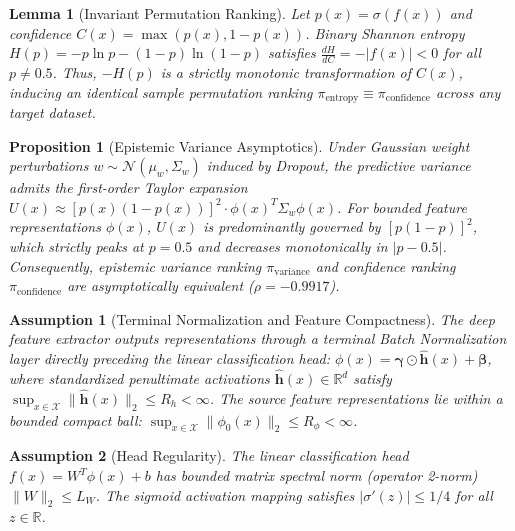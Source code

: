 \documentclass[journal]{IEEEtran}
\newtheorem{lemma}{Lemma}
\newtheorem{proposition}{Proposition}
\newtheorem{assumption}{Assumption}
\begin{document}
\begin{lemma}[Invariant Permutation Ranking]
\label{lem:ranking}
Let $p(x) = \sigma(f(x))$ and confidence $C(x) = \max(p(x), 1 - p(x))$. Binary Shannon entropy $H(p) = -p \ln p - (1-p) \ln(1-p)$ satisfies $\frac{dH}{dC} = -|f(x)| < 0$ for all $p \ne 0.5$. Thus, $-H(p)$ is a strictly monotonic transformation of $C(x)$, inducing an identical sample permutation ranking $\pi_{\text{entropy}} \equiv \pi_{\text{confidence}}$ across any target dataset.
\end{lemma}

\begin{proposition}[Epistemic Variance Asymptotics]
\label{prop:variance}
Under Gaussian weight perturbations $w \sim \mathcal{N}(\mu_w, \Sigma_w)$ induced by Dropout, the predictive variance admits the first-order Taylor expansion $U(x) \approx [p(x)(1 - p(x))]^2 \cdot \phi(x)^T \Sigma_w \phi(x)$. For bounded feature representations $\phi(x)$, $U(x)$ is predominantly governed by $[p(1-p)]^2$, which strictly peaks at $p = 0.5$ and decreases monotonically in $|p - 0.5|$. Consequently, epistemic variance ranking $\pi_{\text{variance}}$ and confidence ranking $\pi_{\text{confidence}}$ are asymptotically equivalent ($\rho = -0.9917$).
\end{proposition}

\begin{assumption}[Terminal Normalization and Feature Compactness]
\label{ass:compactness}
The deep feature extractor outputs representations through a terminal Batch Normalization layer directly preceding the linear classification head: $\phi(x) = \boldsymbol{\gamma} \odot \hat{\mathbf{h}}(x) + \boldsymbol{\beta}$, where standardized penultimate activations $\hat{\mathbf{h}}(x) \in \mathbb{R}^d$ satisfy $\sup_{x \in \mathcal{X}} \|\hat{\mathbf{h}}(x)\|_2 \le R_h < \infty$. The source feature representations lie within a bounded compact ball: $\sup_{x \in \mathcal{X}} \|\phi_0(x)\|_2 \le R_\phi < \infty$.
\end{assumption}

\begin{assumption}[Head Regularity]
\label{ass:head}
The linear classification head $f(x) = W^T \phi(x) + b$ has bounded matrix spectral norm (operator 2-norm) $\|W\|_2 \le L_W$. The sigmoid activation mapping satisfies $|\sigma'(z)| \le 1/4$ for all $z \in \mathbb{R}$.
\end{assumption}
\end{document}
